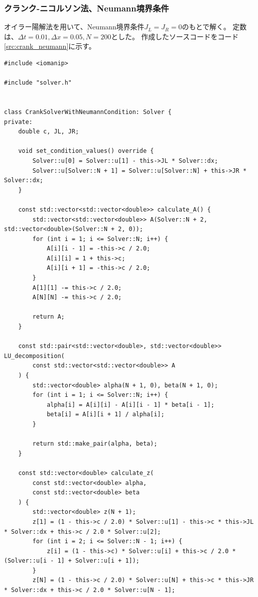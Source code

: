 \documentclass[a4j, titlepage]{jsarticle}
\numberwithin{equation}{section}
\begin{document}
        \subsubsection{クランク-ニコルソン法、Neumann境界条件}
            オイラー陽解法を用いて、Neumann境界条件$J_L = J_R = 0$のもとで解く。
            定数は、$\Delta t = 0.01, \Delta x = 0.05, N = 200$とした。
            作成したソースコードをコード\ref{src:crank_neumann}に示す。
            \begin{lstlisting}[caption=クランク-ニコルソン法を用いてNeumann境界条件のもとで解くソースコード, label=src:crank_neumann]
#include <iomanip>

#include "solver.h"


class CrankSolverWithNeumannCondition: Solver {
private:
    double c, JL, JR;

    void set_condition_values() override {
        Solver::u[0] = Solver::u[1] - this->JL * Solver::dx;
        Solver::u[Solver::N + 1] = Solver::u[Solver::N] + this->JR * Solver::dx;
    }

    const std::vector<std::vector<double>> calculate_A() {
        std::vector<std::vector<double>> A(Solver::N + 2, std::vector<double>(Solver::N + 2, 0));
        for (int i = 1; i <= Solver::N; i++) {
            A[i][i - 1] = -this->c / 2.0;
            A[i][i] = 1 + this->c;
            A[i][i + 1] = -this->c / 2.0;
        }
        A[1][1] -= this->c / 2.0;
        A[N][N] -= this->c / 2.0;

        return A;
    }

    const std::pair<std::vector<double>, std::vector<double>> LU_decomposition(
        const std::vector<std::vector<double>> A
    ) {
        std::vector<double> alpha(N + 1, 0), beta(N + 1, 0);
        for (int i = 1; i <= Solver::N; i++) {
            alpha[i] = A[i][i] - A[i][i - 1] * beta[i - 1];
            beta[i] = A[i][i + 1] / alpha[i];
        }

        return std::make_pair(alpha, beta);
    }

    const std::vector<double> calculate_z(
        const std::vector<double> alpha,
        const std::vector<double> beta
    ) {
        std::vector<double> z(N + 1);
        z[1] = (1 - this->c / 2.0) * Solver::u[1] - this->c * this->JL * Solver::dx + this->c / 2.0 * Solver::u[2];
        for (int i = 2; i <= Solver::N - 1; i++) {
            z[i] = (1 - this->c) * Solver::u[i] + this->c / 2.0 * (Solver::u[i - 1] + Solver::u[i + 1]);
        }
        z[N] = (1 - this->c / 2.0) * Solver::u[N] + this->c * this->JR * Solver::dx + this->c / 2.0 * Solver::u[N - 1];


\end{lstlisting}
\end{document}

